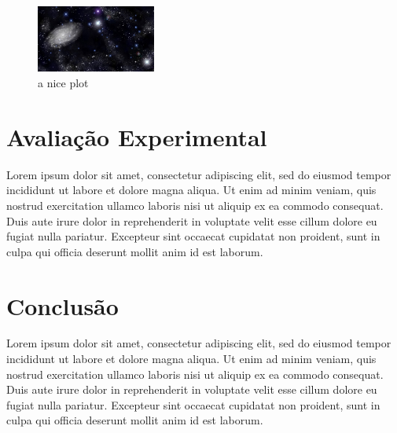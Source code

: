 \documentclass[10pt, a4paper,twocolumn]{article}
\begin{document}
\begin{figure}[h]
    \centering
    \includegraphics[width=0.35\textwidth]{imgs/universe.jpg}
    \caption{a nice plot}
    \label{fig:mesh1}
\end{figure}

\section{Avaliação Experimental}
Lorem ipsum dolor sit amet, consectetur adipiscing elit, sed do eiusmod tempor incididunt ut labore et dolore magna aliqua. Ut enim ad minim veniam, quis nostrud exercitation ullamco laboris nisi ut aliquip ex ea commodo consequat. Duis aute irure dolor in reprehenderit in voluptate velit esse cillum dolore eu fugiat nulla pariatur. Excepteur sint occaecat cupidatat non proident, sunt in culpa qui officia deserunt mollit anim id est laborum.

\section{Conclusão}
Lorem ipsum dolor sit amet, consectetur adipiscing elit, sed do eiusmod tempor incididunt ut labore et dolore magna aliqua. Ut enim ad minim veniam, quis nostrud exercitation ullamco laboris nisi ut aliquip ex ea commodo consequat. Duis aute irure dolor in reprehenderit in voluptate velit esse cillum dolore eu fugiat nulla pariatur. Excepteur sint occaecat cupidatat non proident, sunt in culpa qui officia deserunt mollit anim id est laborum.

\printbibliography
\end{document}
